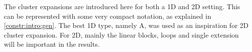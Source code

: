 The cluster expansions are introduced here for both a 1D and 2D setting. This can be represented with some very compact notation, as explained in \cref{constr:intro:gen}. The best 1D type, namely A, was used as an inspiration for 2D cluster expansion. For 2D, mainly the linear blocks, loops and single extension will be important in the results.